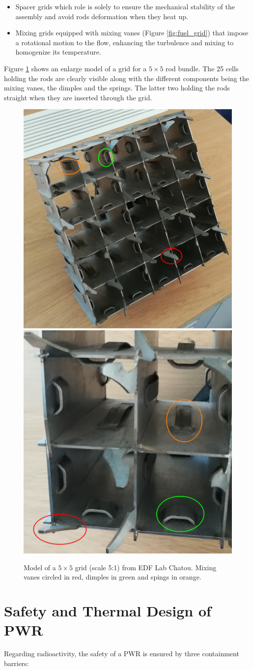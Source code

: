 \begin{itemize}
\item Spacer grids which role is solely to ensure the mechanical stability of the assembly and avoid rods deformation when they heat up.
\item Mixing grids equipped with mixing vanes (Figure \ref{fig:fuel_grid}) that impose a rotational motion to the flow, enhancing the turbulence and mixing to homogenize its temperature.
\end{itemize}

Figure \ref{fig:fuel_grid_I8C} shows an enlarge model of a grid for a $5 \times 5$ rod bundle. The 25 cells holding the rods are clearly visible along with the different components being the mixing vanes, the dimples and the springs. The latter two holding the rods straight when they are inserted through the grid.


\begin{figure}[!h]
\centering
\includegraphics[width=0.3\linewidth]{img/intro/MaquetteGrille.png}
\includegraphics[width=0.3\linewidth]{img/intro/CanauxGrille.jpg}
\caption{Model of a $5 \times 5$ grid (scale 5:1) from EDF Lab Chatou. Mixing vanes circled in red, dimples in green and spings in orange.}
\label{fig:fuel_grid_I8C}
\end{figure}


\section{Safety and Thermal Design of PWR}

Regarding radioactivity, the safety of a PWR is ensured by three containment barriers:

